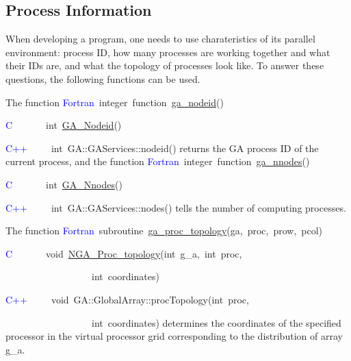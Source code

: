 \subsection{Process Information }

When developing a program, one needs to use charateristics of its
parallel environment: process ID, how many processes are working together
and what their IDs are, and what the topology of processes look like.
To answer these questions, the following functions can be used.

The function
\textcolor{blue}{Fortran}~integer~function~\href{http://www.emsl.pnl.gov/docs/global/ga_ops.html\#ga_nodeid}{ga\_{}nodeid}()~

\textcolor{blue}{C}~~~~~~~int~\href{http://www.emsl.pnl.gov/docs/global/c_nga_ops.html\#ga_nodeid}{GA\_{}Nodeid}()~

\textcolor{blue}{C++~}~~~~int~GA::GAServices::nodeid()
returns the GA process ID of the current process, and the function
\textcolor{blue}{Fortran}~integer~function~\href{http://www.emsl.pnl.gov/docs/global/ga_ops.html\#ga_nnodes}{ga\_{}nnodes}()~

\textcolor{blue}{C}~~~~~~~int~\href{http://www.emsl.pnl.gov/docs/global/c_nga_ops.html\#ga_nnodes}{GA\_{}Nnodes}()~

\textcolor{blue}{C++~}~~~~int~GA::GAServices::nodes()
tells the number of computing processes.

The function
\textcolor{blue}{Fortran~}subroutine~\href{http://www.emsl.pnl.gov/docs/global/ga_ops.html\#ga_proc_topology}{ga\_{}proc\_{}topology}(ga,~proc,~prow,~pcol)

\textcolor{blue}{C}~~~~~~~void~\href{http://www.emsl.pnl.gov/docs/global/c_nga_ops.html\#ga_proc_topology}{NGA\_{}Proc\_{}topology}(int~g\_a,~int~proc,~

~~~~~~~~~~~~~~~~~~int~coordinates)

\textcolor{blue}{C++~}~~~~void~GA::GlobalArray::procTopology(int~proc,~

~~~~~~~~~~~~~~~~~~int~coordinates)
determines the coordinates of the specified processor in the virtual
processor grid corresponding to the distribution of array g\_a.

